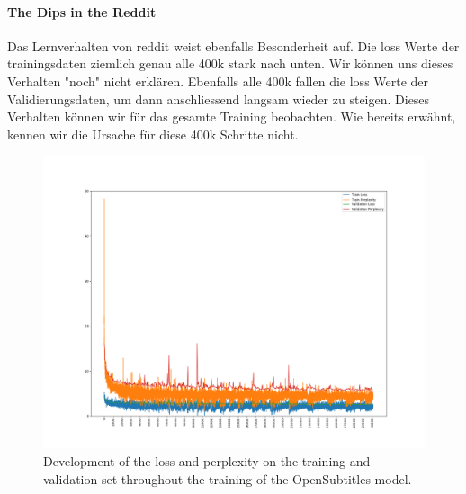 \paragraph{The Dips in the Reddit} Das Lernverhalten von reddit weist ebenfalls Besonderheit auf. Die loss Werte der trainingsdaten ziemlich genau alle 400k stark nach unten. Wir können uns dieses Verhalten "noch" nicht erklären. Ebenfalls alle 400k fallen die loss Werte der Validierungsdaten, um dann anschliessend langsam wieder zu steigen. Dieses Verhalten können wir für das gesamte Training beobachten. Wie bereits erwähnt, kennen wir die Ursache für diese 400k Schritte nicht.
\begin{figure}[H]
	\includegraphics[width=\linewidth]{img/plots/opensubtitles_not_reversed/train_metrics.png}
	\caption{Development of the loss and perplexity on the training and validation set throughout the training of the OpenSubtitles model.}
	\label{results:learning_process:metrics:opensubtitles}
\end{figure}

